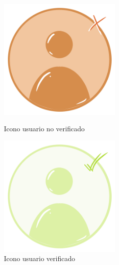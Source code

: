\documentclass[a4paper, 12pt]{article}
\begin{document}
\begin{figure}[H]
   	\begin{minipage}{0.48\textwidth}
		\begin{center}
			{\includegraphics[width=6cm]{USERNV.png}\par}
			\caption{Icono usuario no verificado}
		\end{center}  
	\end{minipage}\hfill
   	\begin{minipage}{0.48\textwidth}
		\begin{center}
			{\includegraphics[width=6cm]{USERV.png}\par}
			\caption{Icono usuario verificado}
		\end{center}  
	\end{minipage}\hfill
\end{figure}
\end{document}
